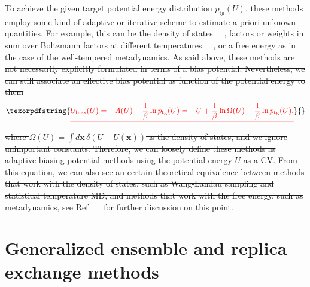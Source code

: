 \documentclass[9pt,review]{livecoms}
\newcommand{\vx}{\mathbf{x}}
\providecommand{\DIFaddtex}[1]{{\protect\color{blue}\uwave{#1}}} %
\providecommand{\DIFdeltex}[1]{{\protect\color{red}\sout{#1}}}                      %
\providecommand{\DIFaddbegin}{} %
\providecommand{\DIFaddend}{} %
\providecommand{\DIFdelend}{} %
\providecommand{\DIFadd}[1]{\texorpdfstring{\DIFaddtex{#1}}{#1}} %
\providecommand{\DIFdel}[1]{\texorpdfstring{\DIFdeltex{#1}}{}} %
\newcommand{\DIFaddincludegraphics}[2][]{{\color{blue}\fbox{\DIFOincludegraphics[#1]{#2}}}} %
\DeclareRobustCommand{\DIFaddbegin}{\DIFOaddbegin \let\includegraphics\DIFaddincludegraphics} %
\DeclareRobustCommand{\DIFaddend}{\DIFOaddend \let\includegraphics\DIFOincludegraphics} %
\DeclareRobustCommand{\DIFdelend}{\DIFOaddend \let\includegraphics\DIFOincludegraphics} %
\begin{document}
\DIFdel{To achieve the given target potential energy distribution $p_{\mathrm{tg}}(U)$, these methods employ some kind of adaptive or iterative scheme to estimate a priori unknown quantities. For example, this can be the density of states~\mbox{%
\cite{wang-landau:prl:2001:wang-landau,Kim2006_PRL_STMD,DePablo_DOS_2012}}\hspace{0pt}%
, factors or weights in sum over Boltzmann factors at different temperatures~\mbox{%
\cite{Gao_ITS_2008,invernizzi2020unified}}\hspace{0pt}%
, or a free energy as in the case of the well-tempered metadynamics. As said above, these methods are not necessarily explicitly formulated in terms of a bias potential. Nevertheless, we can still associate an effective bias potential as function of the potential energy to them
}\begin{displaymath}
\DIFdel{U_\mathrm{bias}(U) = - A(U) -\frac{1}{\beta} \ln p_{\mathrm{tg}}(U) = - U + \frac{1}{\beta} \ln \Omega(U) -\frac{1}{\beta} \ln p_{\mathrm{tg}}(U),
}\end{displaymath}
\DIFdel{where $\Omega(U) = \int d\vx \, \delta(U-U(\vx))$ is the density of states, and we ignore unimportant constants. Therefore, we can loosely define these methods as adaptive biasing potential methods using the potential energy $U$ as a CV. From this equation, we can also see an certain theoretical equivalence between methods that work with the density of states, such as Wang-Landau sampling and statistical temperature MD, and methods that work with the free energy, such as metadynamics, see Ref~\mbox{%
\cite{Junghans2014wte-wl} }\hspace{0pt}%
for further discussion on this point}\DIFdelend \DIFaddbegin \DIFadd{~\mbox{%
\cite{Sidky2018}}\hspace{0pt}%
}\DIFaddend .



\section{Generalized ensemble and replica exchange methods}
\label{sec:generalized-ensemble}
\end{document}
